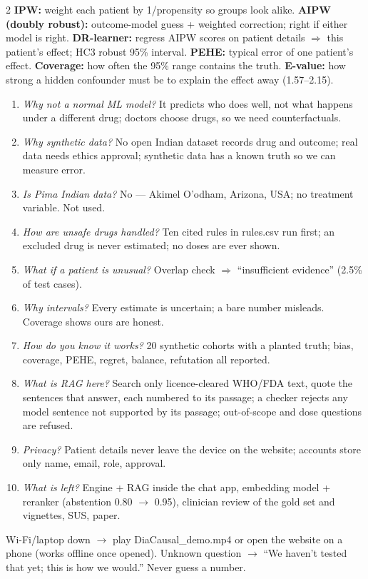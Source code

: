 \documentclass[11pt]{extarticle}
\newcommand{\h}[1]{\par\smallskip{\color{navy}\bfseries #1}\par}
\begin{document}
\begin{multicols}{2}
\textbf{IPW:} weight each patient by 1/propensity so groups look alike.
\textbf{AIPW (doubly robust):} outcome-model guess + weighted correction; right if either model is right.
\textbf{DR-learner:} regress AIPW scores on patient details $\Rightarrow$ this patient's effect; HC3 robust 95\% interval.
\textbf{PEHE:} typical error of one patient's effect. \textbf{Coverage:} how often the 95\% range contains the truth.
\textbf{E-value:} how strong a hidden confounder must be to explain the effect away (1.57--2.15).
\h{Ten likely questions}
\begin{enumerate}[leftmargin=1.3em]
\item \emph{Why not a normal ML model?} It predicts who does well, not what happens under a different drug; doctors choose drugs, so we need counterfactuals.
\item \emph{Why synthetic data?} No open Indian dataset records drug and outcome; real data needs ethics approval; synthetic data has a known truth so we can measure error.
\item \emph{Is Pima Indian data?} No --- Akimel O'odham, Arizona, USA; no treatment variable. Not used.
\item \emph{How are unsafe drugs handled?} Ten cited rules in rules.csv run first; an excluded drug is never estimated; no doses are ever shown.
\item \emph{What if a patient is unusual?} Overlap check $\Rightarrow$ ``insufficient evidence'' (2.5\% of test cases).
\item \emph{Why intervals?} Every estimate is uncertain; a bare number misleads. Coverage shows ours are honest.
\item \emph{How do you know it works?} 20 synthetic cohorts with a planted truth; bias, coverage, PEHE, regret, balance, refutation all reported.
\item \emph{What is RAG here?} Search only licence-cleared WHO/FDA text, quote the sentences that answer, each numbered to its passage; a checker rejects any model sentence not supported by its passage; out-of-scope and dose questions are refused.
\item \emph{Privacy?} Patient details never leave the device on the website; accounts store only name, email, role, approval.
\item \emph{What is left?} Engine + RAG inside the chat app, embedding model + reranker (abstention 0.80 $\to$ 0.95), clinician review of the gold set and vignettes, SUS, paper.
\end{enumerate}
\h{If something fails}
Wi-Fi/laptop down $\rightarrow$ play DiaCausal\_demo.mp4 or open the website on a phone (works offline once opened). Unknown question $\rightarrow$ ``We haven't tested that yet; this is how we would.'' Never guess a number.
\end{multicols}
\end{document}
